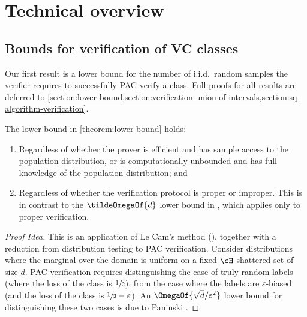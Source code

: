 \documentclass{toc}
\begin{document}
\section{Technical overview}\label{section:technical-overview}

\subsection{Bounds for verification of VC classes}

Our first result is a lower bound for the number of i.i.d.\ random samples the verifier requires to successfully PAC verify a class. Full proofs for all results are deferred to \cref{section:lower-bound,section:verification-union-of-intervals,section:sq-algorithm-verification}.


\begin{remark}
	The lower bound in \cref{theorem:lower-bound} holds:
	\begin{enumerate}
		\item{
			Regardless of whether the prover is efficient and has sample access to the population distribution, or is computationally unbounded and has full knowledge of the population distribution; and
		}
		\item{
			Regardless of whether the verification protocol is proper or improper. This is in contrast to the $\tildeOmegaOf{d}$ lower bound in %
			\cite[Lemma 4.1]{GoldwasserRSY21}, %
			which applies only to proper verification.
		}
	\end{enumerate}
\end{remark}

\begin{proof}[Proof Idea]
	This is an application of Le Cam's method (), together with a reduction from distribution testing to PAC verification.  
	Consider distributions where the marginal over the domain is uniform on a fixed $\cH$-shattered set of size $d$.
	PAC verification requires distinguishing the case of truly random labels (where the loss of the class is $\sfrac{1}{2}$), from the case where the labels are $\varepsilon$-biased (and the loss of the class is $\sfrac{1}{2}-\varepsilon$). An $\OmegaOf{\sqrt{d}/\varepsilon^2}$ lower bound for distinguishing these two cases is due to Paninski \cite{DBLP:journals/tit/Paninski08}.
\end{proof}
\end{document}
